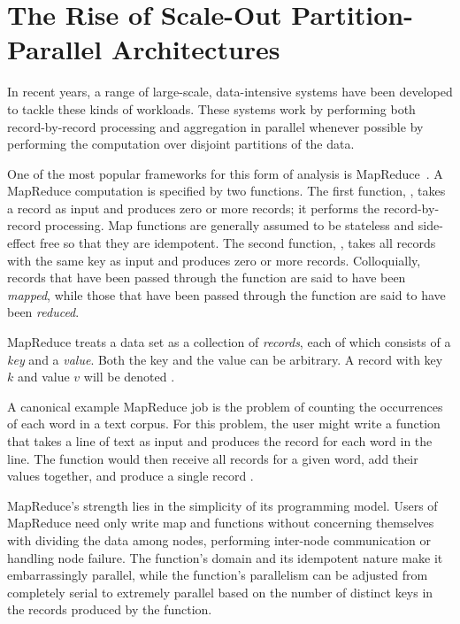 \section{The Rise of Scale-Out Partition-Parallel Architectures}


In recent years, a range of large-scale, data-intensive systems have been
developed to tackle these kinds of workloads.  These systems work by
performing both record-by-record processing and aggregation in parallel whenever
possible by performing the computation over disjoint partitions of the
data.

One of the most popular frameworks for this form of analysis is
MapReduce~\cite{mapreduce}. A MapReduce computation is specified by two
functions. The first function, \map, takes a record as input and produces
zero or more records; it performs the record-by-record processing. Map
functions are generally assumed to be stateless and side-effect free so that
they are idempotent. The second function, \reduce, takes all records with
the same key as input and produces zero or more records. Colloquially, records
that have been passed through the \map function are said to have been
\emph{mapped}, while those that have been passed through the \reduce function
are said to have been \emph{reduced}.

MapReduce treats a data set as a collection of \emph{records}, each of which
consists of a \emph{key} and a \emph{value}. Both the key and the value can be
arbitrary. A record with key $k$ and value $v$ will be denoted .

A canonical example MapReduce job is the problem of counting the occurrences of
each word in a text corpus. For this problem, the user might write a \map
function that takes a line of text as input and produces the record
 for each word in the line. The \reduce function would then
receive all records for a given word, add their values together, and produce a
single record .

MapReduce's strength lies in the simplicity of its programming model. Users of
MapReduce need only write map and \reduce functions without concerning
themselves with dividing the data among nodes, performing inter-node
communication or handling node failure. The \map function's domain and its
idempotent nature make it embarrassingly parallel, while the \reduce function's
parallelism can be adjusted from completely serial to extremely parallel based
on the number of distinct keys in the records produced by the \map function.

